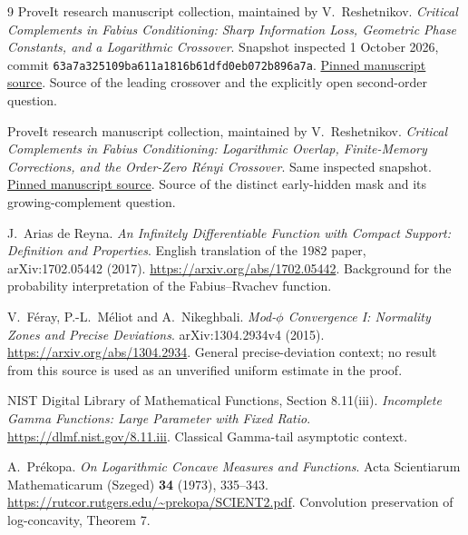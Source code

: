 \documentclass[11pt,oneside]{article}
\theoremstyle{remark}\newtheorem{remark}[theorem]{Remark}
\numberwithin{equation}{section}
\begin{document}
\begin{thebibliography}{9}
ProveIt research manuscript collection, maintained by V.~Reshetnikov.
\emph{Critical Complements in Fabius Conditioning: Sharp Information Loss,
Geometric Phase Constants, and a Logarithmic Crossover}.
Snapshot inspected 1 October 2026, commit
\nolinkurl{63a7a325109ba611a1816b61dfd0eb072b896a7a}.
\href{https://github.com/VladimirReshetnikov/ProveIt/blob/63a7a325109ba611a1816b61dfd0eb072b896a7a/Analysis/FabiusFunction/docs/semi-formalized-research-frontiers/drafts/representations/Critical_Complements_Sharp_Information_Loss/article.tex}{Pinned manuscript source}.
Source of the leading crossover and the explicitly open second-order question.

ProveIt research manuscript collection, maintained by V.~Reshetnikov.
\emph{Critical Complements in Fabius Conditioning: Logarithmic Overlap,
Finite-Memory Corrections, and the Order-Zero R\'enyi Crossover}.
Same inspected snapshot.
\href{https://github.com/VladimirReshetnikov/ProveIt/blob/63a7a325109ba611a1816b61dfd0eb072b896a7a/Analysis/FabiusFunction/docs/semi-formalized-research-frontiers/drafts/representations/Critical_Complements_Fabius_Conditioning/article.tex}{Pinned manuscript source}.
Source of the distinct early-hidden mask and its growing-complement question.

J.~Arias de Reyna.
\emph{An Infinitely Differentiable Function with Compact Support:
Definition and Properties}.
English translation of the 1982 paper, arXiv:1702.05442 (2017).
\url{https://arxiv.org/abs/1702.05442}.
Background for the probability interpretation of the Fabius--Rvachev function.

V.~F\'eray, P.-L.~M\'eliot and A.~Nikeghbali.
\emph{Mod-$\phi$ Convergence I: Normality Zones and Precise Deviations}.
arXiv:1304.2934v4 (2015).
\url{https://arxiv.org/abs/1304.2934}.
General precise-deviation context; no result from this source is used as an
unverified uniform estimate in the proof.

NIST Digital Library of Mathematical Functions, Section 8.11(iii).
\emph{Incomplete Gamma Functions: Large Parameter with Fixed Ratio}.
\url{https://dlmf.nist.gov/8.11.iii}.
Classical Gamma-tail asymptotic context.

A.~Pr\'ekopa.
\emph{On Logarithmic Concave Measures and Functions}.
Acta Scientiarum Mathematicarum (Szeged) \textbf{34} (1973), 335--343.
\url{https://rutcor.rutgers.edu/~prekopa/SCIENT2.pdf}.
Convolution preservation of log-concavity, Theorem 7.
\end{thebibliography}
\end{document}
